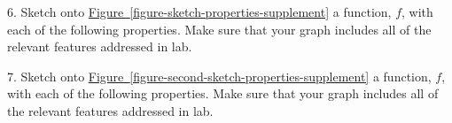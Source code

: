 \documentclass[12pt,]{book}
\theoremstyle{plain}
\theoremstyle{definition}
\numberwithin{equation}{section}
\newcounter{figstack}
\newcounter{figindex}
\newlength\fight
\newcommand\pushValignCaptionBottom[5][b]{%
\stepcounter{figstack}%
\expandafter\def\csname %
figalign\romannumeral\value{figstack}\endcsname{#1}%
\expandafter\def\csname %
figtype\romannumeral\value{figstack}\endcsname{#2}%
\expandafter\def\csname %
figwd\romannumeral\value{figstack}\endcsname{#3}%
\expandafter\def\csname %
figcontent\romannumeral\value{figstack}\endcsname{#4}%
\expandafter\def\csname %
figcap\romannumeral\value{figstack}\endcsname{#5}%
\setbox0=\hbox{%
\begin{#2}{#3}#4\end{#2}}%
\ifdim\dimexpr\ht0+\dp0\relax>\fight\global\setlength{\fight}{%
\dimexpr\ht0+\dp0\relax}\fi%
}
\newcommand\popValignCaptionBottom{%
\setcounter{figindex}{0}%
\hfill%
\whiledo{\value{figindex}<\value{figstack}}{%
\stepcounter{figindex}%
\def\tmp{\csname figwd\romannumeral\value{figindex}\endcsname}%
\begin{\csname figtype\romannumeral\value{figindex}\endcsname}[t]{\tmp}%
\centering%
\stackinset{c}{}%
{\csname figalign\romannumeral\value{figindex}\endcsname}{}%
{\csname figcontent\romannumeral\value{figindex}\endcsname}%
{\rule{0pt}{\fight}}\par%
\csname figcap\romannumeral\value{figindex}\endcsname%
\end{\csname figtype\romannumeral\value{figindex}\endcsname}%
\hfill%
}%
\setcounter{figstack}{0}%
\setlength{\fight}{0pt}%
\hfill%
}
\providecommand\phantomsection{}
\newcommand{\fe}[2]{\mathop{{#1}{\left(#2\right)}}}
\newcommand{\ointerval}[2]{\left(#1,#2\right)}
\begin{document}
\begin{exerciselist}
\item[6.]\phantomsection\hypertarget{exercise-143}{\null}Sketch onto \hyperref[figure-sketch-properties-supplement]{Figure~\ref*{figure-sketch-properties-supplement}} a function, \(f\), with each of the following properties. Make sure that your graph includes all of the relevant features addressed in lab.%
\par\smallskip
\item[7.]\phantomsection\hypertarget{exercise-144}{\null}Sketch onto \hyperref[figure-second-sketch-properties-supplement]{Figure~\ref*{figure-second-sketch-properties-supplement}} a function, \(f\), with each of the following properties. Make sure that your graph includes all of the relevant features addressed in lab.%
\end{exerciselist}
\end{document}
